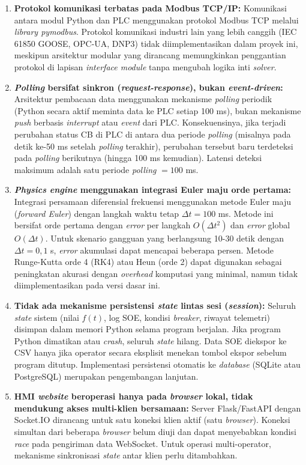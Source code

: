 \begin{enumerate}
    \item[a.] \textbf{Protokol komunikasi terbatas pada Modbus TCP/IP:} Komunikasi antara modul Python dan PLC menggunakan protokol Modbus TCP melalui \textit{library pymodbus}. Protokol komunikasi industri lain yang lebih canggih (IEC 61850 GOOSE, OPC-UA, DNP3) tidak diimplementasikan dalam proyek ini, meskipun arsitektur modular yang dirancang memungkinkan penggantian protokol di lapisan \textit{interface module} tanpa mengubah logika inti \textit{solver}.
    
    \item[b.] \textbf{\textit{Polling} bersifat sinkron (\textit{request-response}), bukan \textit{event-driven}:} Arsitektur pembacaan data menggunakan mekanisme \textit{polling} periodik (Python secara aktif meminta data ke PLC setiap 100 ms), bukan mekanisme \textit{push} berbasis \textit{interrupt} atau \textit{event} dari PLC. Konsekuensinya, jika terjadi perubahan status CB di PLC di antara dua periode \textit{polling} (misalnya pada detik ke-50 ms setelah \textit{polling} terakhir), perubahan tersebut baru terdeteksi pada \textit{polling} berikutnya (hingga 100 ms kemudian). Latensi deteksi maksimum adalah satu periode \textit{polling} $= 100$ ms.
    
    \item[c.] \textbf{\textit{Physics engine} menggunakan integrasi Euler maju orde pertama:} Integrasi persamaan diferensial frekuensi menggunakan metode Euler maju (\textit{forward Euler}) dengan langkah waktu tetap $\Delta t=100$ ms. Metode ini bersifat orde pertama dengan \textit{error} per langkah $O(\Delta t^{2})$ dan \textit{error} global $O(\Delta t)$. Untuk skenario gangguan yang berlangsung 10-30 detik dengan $\Delta t=0,1$ s, \textit{error} akumulasi dapat mencapai beberapa persen. Metode Runge-Kutta orde 4 (RK4) atau Heun (orde 2) dapat digunakan sebagai peningkatan akurasi dengan \textit{overhead} komputasi yang minimal, namun tidak diimplementasikan pada versi dasar ini.
    
    \item[d.] \textbf{Tidak ada mekanisme persistensi \textit{state} lintas sesi (\textit{session}):} Seluruh \textit{state} sistem (nilai $f(t)$, log SOE, kondisi \textit{breaker}, riwayat telemetri) disimpan dalam memori Python selama program berjalan. Jika program Python dimatikan atau \textit{crash}, seluruh \textit{state} hilang. Data SOE diekspor ke CSV hanya jika operator secara eksplisit menekan tombol ekspor sebelum program ditutup. Implementasi persistensi otomatis ke \textit{database} (SQLite atau PostgreSQL) merupakan pengembangan lanjutan.
    
    \item[e.] \textbf{HMI \textit{website} beroperasi hanya pada \textit{browser} lokal, tidak mendukung akses multi-klien bersamaan:} Server Flask/FastAPI dengan Socket.IO dirancang untuk satu koneksi klien aktif (satu \textit{browser}). Koneksi simultan dari beberapa \textit{browser} belum diuji dan dapat menyebabkan kondisi \textit{race} pada pengiriman data WebSocket. Untuk operasi multi-operator, mekanisme sinkronisasi \textit{state} antar klien perlu ditambahkan.
\end{enumerate}

